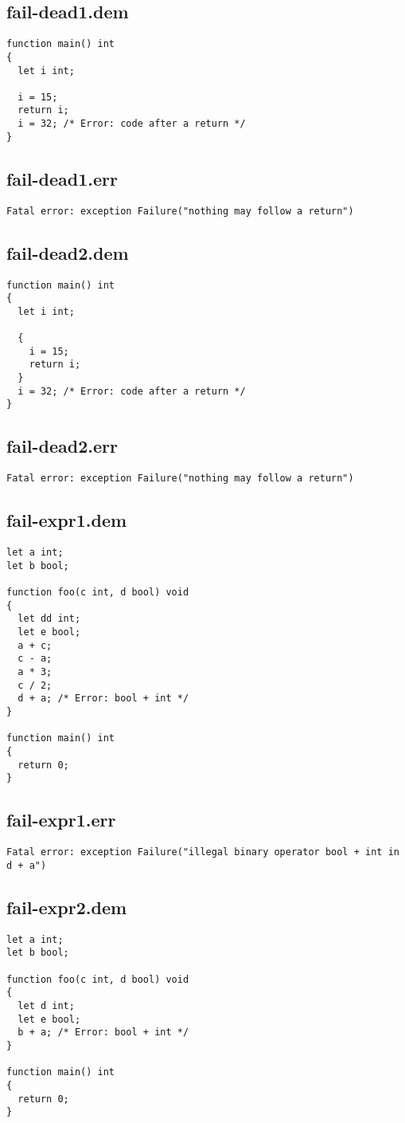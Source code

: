 \subsection{fail-dead1.dem}
\begin{lstlisting}
function main() int
{
  let i int;

  i = 15;
  return i;
  i = 32; /* Error: code after a return */
}
\end{lstlisting}
\subsection{fail-dead1.err}
\begin{lstlisting}
Fatal error: exception Failure("nothing may follow a return")
\end{lstlisting}
\subsection{fail-dead2.dem}
\begin{lstlisting}
function main() int
{
  let i int;

  {
    i = 15;
    return i;
  }
  i = 32; /* Error: code after a return */
}
\end{lstlisting}
\subsection{fail-dead2.err}
\begin{lstlisting}
Fatal error: exception Failure("nothing may follow a return")
\end{lstlisting}
\subsection{fail-expr1.dem}
\begin{lstlisting}
let a int;
let b bool;

function foo(c int, d bool) void
{
  let dd int;
  let e bool;
  a + c;
  c - a;
  a * 3;
  c / 2;
  d + a; /* Error: bool + int */
}

function main() int
{
  return 0;
}
\end{lstlisting}
\subsection{fail-expr1.err}
\begin{lstlisting}
Fatal error: exception Failure("illegal binary operator bool + int in d + a")
\end{lstlisting}
\subsection{fail-expr2.dem}
\begin{lstlisting}
let a int;
let b bool;

function foo(c int, d bool) void
{
  let d int;
  let e bool;
  b + a; /* Error: bool + int */
}

function main() int
{
  return 0;
}
\end{lstlisting}
